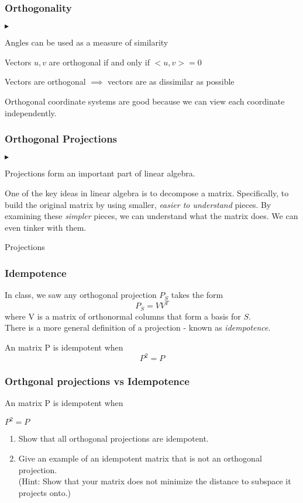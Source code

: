 \documentclass{beamer}
\renewenvironment{itemize}
\renewenvironment{enumerate}%
{\begin{list}{\arabic{enumi}.}%
      {\setlength{\leftmargin}{2.5em}%
       \setlength{\itemsep}{-\parsep}%
       \setlength{\topsep}{-\parskip}%
       \usecounter{enumi}}%
 }{\end{list}}
\renewenvironment{itemize}%
{\begin{list}{$\blacktriangleright$}%
      {\setlength{\leftmargin}{2.5em}%
       \setlength{\itemsep}{-\parsep}%
       \setlength{\topsep}{-\parskip}%
       \usecounter{enumi}}%
 }{\end{list}}
\begin{document}
\begin{frame}
\frametitle{Orthogonality}
\begin{itemize}
\item Angles can be used as a measure of similarity
\item Vectors $u,v$ are orthogonal if and only if $<u,v>=0$
\item Vectors are orthogonal $\implies$ vectors are as dissimilar as possible
\item Orthogonal coordinate systems are good because we can view each coordinate independently.
\end{itemize}
\end{frame}


\begin{frame}
\frametitle{Orthogonal Projections}
\begin{itemize}
\item Projections form an important part of linear algebra.
\item One of the key ideas in linear algebra is to decompose a matrix.
Specifically, to build the original matrix by using smaller, \textit{easier to understand} pieces.
By examining these \textit{simpler} pieces, we can understand what the matrix does. We can even tinker with them.
\end{itemize}
Projections
\end{frame}



\begin{frame}
\frametitle{Idempotence}
In class, we saw any orthogonal projection $P_S$ takes the form
$$P_S = VV^T$$
where V is a matrix of orthonormal columns that form a basis for $S$.\\

There is a more general definition of a projection - known as \textit{idempotence}.
\begin{definition}[Idempotence]
An matrix P is idempotent when
	$$
	P^2=P
	$$
\end{definition}


\end{frame}

\begin{frame}
\frametitle{Orthgonal projections vs Idempotence}
\begin{definition}[Idempotence]
An matrix P is idempotent when
	\begin{center}
	$P^2=P$
	\end{center}
\end{definition}


\begin{enumerate}
\item Show that all orthogonal projections are idempotent.
\item Give an example of an idempotent matrix that is not an orthogonal projection.  \\
(Hint: Show that your matrix does not minimize the distance to subspace it projects onto.)
\end{enumerate}
\end{frame}
\end{document}
